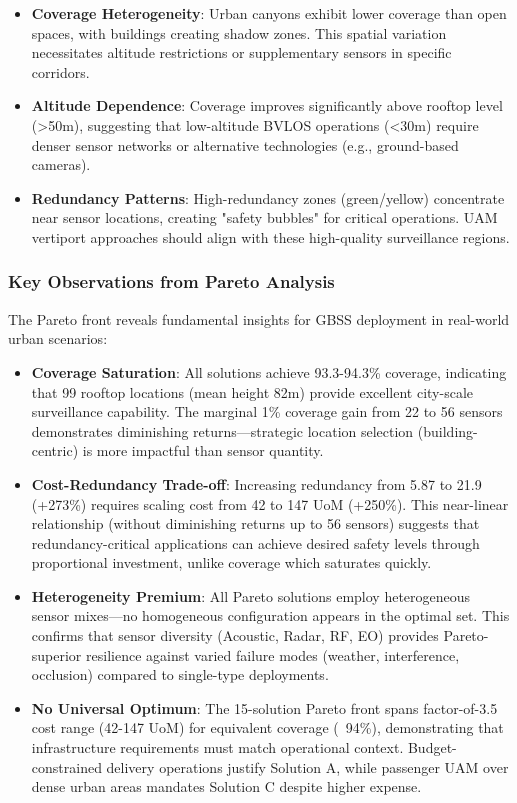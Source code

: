 \begin{itemize}
\item \textbf{Coverage Heterogeneity}: Urban canyons exhibit lower coverage than open spaces, with buildings creating shadow zones. This spatial variation necessitates altitude restrictions or supplementary sensors in specific corridors.

\item \textbf{Altitude Dependence}: Coverage improves significantly above rooftop level (>50m), suggesting that low-altitude BVLOS operations (<30m) require denser sensor networks or alternative technologies (e.g., ground-based cameras).

\item \textbf{Redundancy Patterns}: High-redundancy zones (green/yellow) concentrate near sensor locations, creating "safety bubbles" for critical operations. UAM vertiport approaches should align with these high-quality surveillance regions.
\end{itemize}

\subsubsection{Key Observations from Pareto Analysis}

The Pareto front reveals fundamental insights for GBSS deployment in real-world urban scenarios:

\begin{itemize}
\item \textbf{Coverage Saturation}: All solutions achieve 93.3-94.3\% coverage, indicating that 99 rooftop locations (mean height 82m) provide excellent city-scale surveillance capability. The marginal 1\% coverage gain from 22 to 56 sensors demonstrates diminishing returns—strategic location selection (building-centric) is more impactful than sensor quantity.

\item \textbf{Cost-Redundancy Trade-off}: Increasing redundancy from 5.87 to 21.9 (+273\%) requires scaling cost from 42 to 147 UoM (+250\%). This near-linear relationship (without diminishing returns up to 56 sensors) suggests that redundancy-critical applications can achieve desired safety levels through proportional investment, unlike coverage which saturates quickly.

\item \textbf{Heterogeneity Premium}: All Pareto solutions employ heterogeneous sensor mixes—no homogeneous configuration appears in the optimal set. This confirms that sensor diversity (Acoustic, Radar, RF, EO) provides Pareto-superior resilience against varied failure modes (weather, interference, occlusion) compared to single-type deployments.

\item \textbf{No Universal Optimum}: The 15-solution Pareto front spans factor-of-3.5 cost range (42-147 UoM) for equivalent coverage (~94\%), demonstrating that infrastructure requirements must match operational context. Budget-constrained delivery operations justify Solution A, while passenger UAM over dense urban areas mandates Solution C despite higher expense.
\end{itemize}

